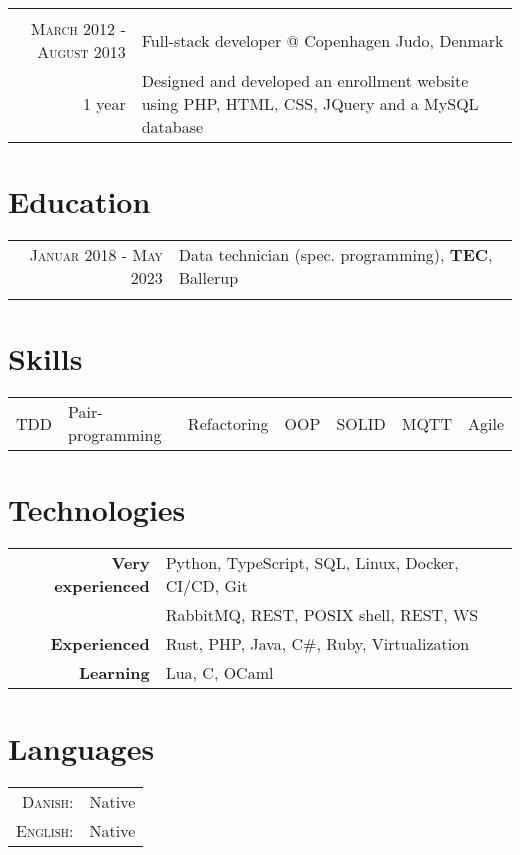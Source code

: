 \documentclass[a4paper,10pt]{article}
\begin{document}
\begin{tabular}{r|p{11cm}}
	\multicolumn{2}{c}{}                                                                       \\
	\textsc{March 2012 - August 2013}      & Full-stack developer @ Copenhagen Judo, Denmark   \\ \footnotesize{1 year}&\footnotesize{Designed and developed an enrollment website using PHP, HTML, CSS, JQuery and a MySQL database}\\
\end{tabular}

\section{Education}
\begin{tabular}{rl}
	\textsc{Januar 2018 - May 2023} & Data technician (spec. programming), \textbf{TEC}, Ballerup \\ & \\
\end{tabular}

\section{Skills}
\begin{tabular}{lllllll}
	TDD & Pair-programming & Refactoring & OOP & SOLID & MQTT & Agile \\
\end{tabular}

\section{Technologies}
\begin{tabular}{rl}
	\textbf{Very experienced} & Python, TypeScript, SQL, Linux, Docker, CI/CD, Git \\
	                          & RabbitMQ, REST, POSIX shell, REST, WS              \\
	\textbf{Experienced}      & Rust, PHP, Java, C\#, Ruby, Virtualization         \\
	\textbf{Learning}         & Lua, C, OCaml
\end{tabular}

\section{Languages}
\begin{tabular}{rl}
	\textsc{Danish:}  & Native \\
	\textsc{English:} & Native \\
\end{tabular}
\end{document}
